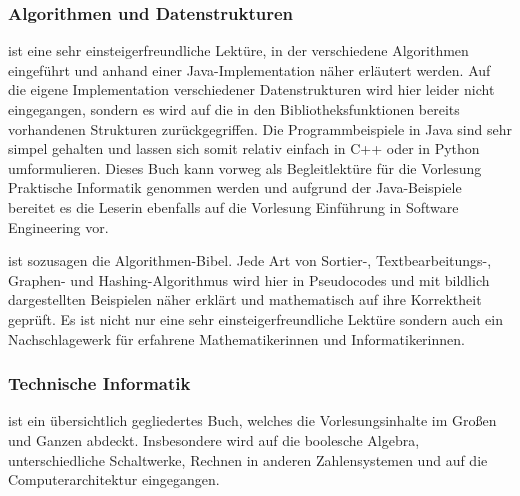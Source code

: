\subsubsection{Algorithmen und Datenstrukturen}
\begin{description}[style=unboxed]
\item[Sedgewick: Algorithms]{
	ist eine sehr einsteigerfreundliche Lektüre, in der verschiedene Algorithmen eingeführt und anhand einer Java-Implementation näher erläutert werden. Auf die eigene Implementation verschiedener Datenstrukturen wird hier leider nicht eingegangen, sondern es wird auf die in den Bibliotheksfunktionen bereits vorhandenen Strukturen zurückgegriffen. Die Programmbeispiele in Java sind sehr simpel gehalten und lassen sich somit relativ einfach in C++ oder in Python umformulieren. Dieses Buch kann vorweg als Begleitlektüre für die Vorlesung Praktische Informatik genommen werden und aufgrund der Java-Beispiele bereitet es die Leserin ebenfalls auf die Vorlesung Einführung in Software Engineering vor.} 

\item[Cormen: Algorithms]{
	ist sozusagen die Algorithmen-Bibel. Jede Art von Sortier-, Textbearbeitungs-, Graphen- und Hashing-Algorithmus wird hier in Pseudocodes und mit bildlich dargestellten Beispielen näher erklärt und mathematisch auf ihre Korrektheit geprüft. Es ist nicht nur eine sehr einsteigerfreundliche Lektüre sondern auch ein Nachschlagewerk für erfahrene Mathematikerinnen und Informatikerinnen.}
\end{description}

\subsubsection{Technische Informatik}
\begin{description}[style=unboxed]
\item[Clements: The Principles of Computer Hardware]{
	ist ein übersichtlich gegliedertes Buch, welches die Vorlesungsinhalte im Großen und Ganzen abdeckt. Insbesondere wird auf die boolesche Algebra, unterschiedliche Schaltwerke, Rechnen in anderen Zahlensystemen und auf die Computerarchitektur eingegangen.}
\end{description}


